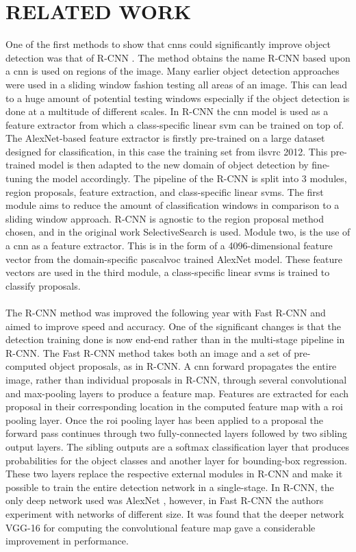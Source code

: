 \documentclass[a4paper,twoside]{article}
\begin{document}
\section{\uppercase{Related Work}}
One of the first methods to show that \glspl{cnn} could significantly improve object detection was that of R-CNN \cite{rcnn}. The method obtains the name R-CNN based upon a \gls{cnn} is used on regions of the image. Many earlier object detection approaches were used in a sliding window fashion testing all areas of an image. This can lead to a huge amount of potential testing windows especially if the object detection is done at a multitude of different scales. In R-CNN the \gls{cnn} model is used as a feature extractor from which a class-specific linear \gls{svm} can be trained on top of. The AlexNet-based feature extractor is firstly pre-trained on a large dataset designed for classification, in this case the training set from \gls{ilsvrc} 2012. This pre-trained model is then adapted to the new domain of object detection by fine-tuning the model accordingly. The pipeline of the R-CNN is split into 3 modules, region proposals, feature extraction, and class-specific linear \glspl{svm}.
The first module aims to reduce the amount of classification windows in comparison to a sliding window approach. R-CNN is agnostic to the region proposal method chosen, and in the original work SelectiveSearch \cite{selectivesearch} is used. Module two, is the use of a \gls{cnn} as a feature extractor. This is in the form of a 4096-dimensional feature vector from the domain-specific \gls{pascalvoc} trained AlexNet model. These feature vectors are used in the third module, a class-specific linear \glspl{svm} is trained to classify proposals.
\\\\
The R-CNN method was improved the following year with Fast R-CNN \cite{fastrcnn} and aimed to improve speed and accuracy. One of the significant changes is that the detection training done is now end-end rather than in the multi-stage pipeline in R-CNN. The Fast R-CNN method takes both an image and a set of pre-computed object proposals, as in R-CNN. A \gls{cnn} forward propagates the entire image, rather than individual proposals in R-CNN, through several convolutional and max-pooling layers to produce a feature map. Features are extracted for each proposal in their corresponding location in the computed feature map with a \gls{roi} pooling layer. Once the \gls{roi} pooling layer has been applied to a proposal the forward pass continues through two fully-connected layers followed by two sibling output layers. The sibling outputs are a softmax classification layer that produces probabilities for the object classes and another layer for bounding-box regression. These two layers replace the respective external modules in R-CNN and make it possible to train the entire detection network in a single-stage. In R-CNN, the only deep network used was AlexNet \cite{alexnet}, however, in Fast R-CNN the authors experiment with networks of different size. It was found that the deeper network VGG-16 \cite{vgg16} for computing the convolutional feature map gave a considerable improvement in performance. 
\end{document}
